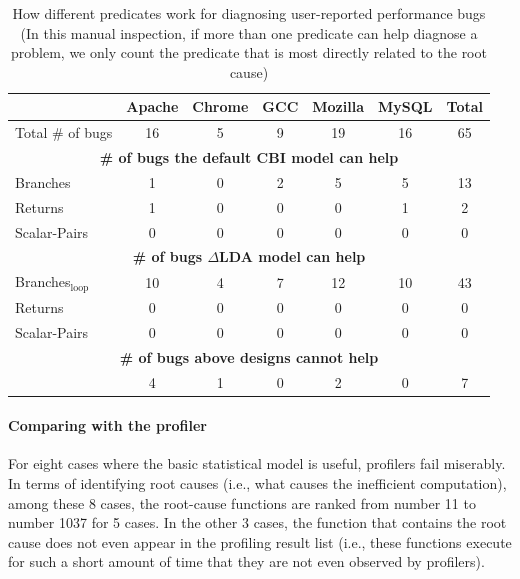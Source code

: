 \begin{table}[tb!]
\begin{adjustwidth}{-.5in}{-.5in}
\small
\centering
{
\begin{tabular}{|lcccccc|}
\hline
&Apache&Chrome&GCC&Mozilla&MySQL&Total\\
\hline
Total \# of bugs  & 16 & 5 & 9 & 19 & 16 & 65 \\
\hline
\multicolumn{7}{|c|}{\bf \# of bugs the default CBI model can help}\\
\multicolumn{1}{|l}{{ Branches} }
&1&0&2&5&5&13\\
\multicolumn{1}{|l}{{ Returns} }
&1&0&0&0&1&2\\
\multicolumn{1}{|l}{{ Scalar-Pairs} }
 &0&0&0&0&0&0\\
\hline
\multicolumn{7}{|c|}{\bf \# of bugs $\Delta$LDA model can help}\\
\multicolumn{1}{|l}{{ Branches$_{\text{loop}}$} }
&10&4&7&12&10&43\\
\multicolumn{1}{|l}{{ Returns} }
&0 &0&0& 0&0&0\\
\multicolumn{1}{|l}{{ Scalar-Pairs} }
&0 &0&0&0 &0&0\\
\hline
\multicolumn{7}{|c|}{\bf \# of bugs above designs cannot help}\\
\multicolumn{1}{|l}{{ } }
&4&1&0&2&0&7 \\
\hline
\end{tabular}
}
\end{adjustwidth}
\caption{How different predicates work for diagnosing user-reported performance bugs (In this manual inspection, if more than one 
predicate can help diagnose a problem, we only count the predicate
that is most directly related to the root cause)}
\label{tab:predicate}
\end{table}

\paragraph{Comparing with the profiler}
For eight cases where the basic statistical model is useful, profilers fail miserably. 
In terms of identifying root causes (i.e., what causes the inefficient 
computation), among these 8 cases,
the root-cause functions are ranked from number 11 to 
number 1037 for 5 cases. In the other 3 cases, the
function that contains the root cause does not even appear in the profiling 
result list (i.e., these functions execute for such a short amount of time that
they are not even observed by profilers).

